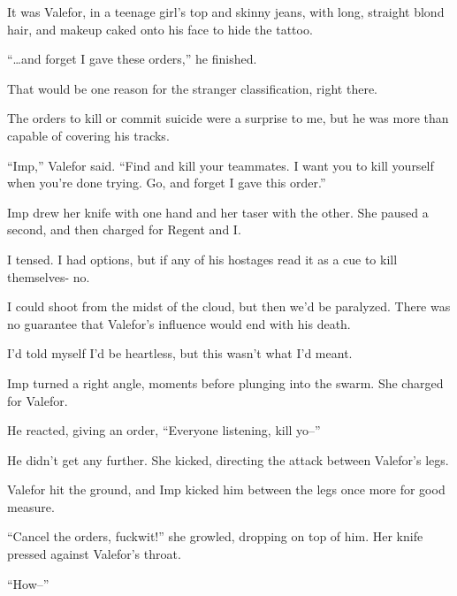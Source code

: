 It was Valefor, in a teenage girl's top and skinny jeans, with long, straight blond hair, and makeup caked onto his face to hide the tattoo.



``\ldots{}and forget I gave these orders,'' he finished.



That would be one reason for the stranger classification, right there.



The orders to kill or commit suicide were a surprise to me, but he was more than capable of covering his tracks.



``Imp,'' Valefor said.  ``Find and kill your teammates.  I want you to kill yourself when you're done trying.  Go, and forget I gave this order.''



Imp drew her knife with one hand and her taser with the other.  She paused a second, and then charged for Regent and I.



I tensed.  I had options, but if any of his hostages read it as a cue to kill themselves-  no.



I could shoot from the midst of the cloud, but then we'd be paralyzed.  There was no guarantee that Valefor's influence would end with his death.



I'd told myself I'd be heartless, but this wasn't what I'd meant.



Imp turned a right angle, moments before plunging into the swarm.  She charged for Valefor.



He reacted, giving an order, ``Everyone listening, kill yo--''



He didn't get any further.  She kicked, directing the attack between Valefor's legs.



Valefor hit the ground, and Imp kicked him between the legs once more for good measure.



``Cancel the orders, fuckwit!'' she growled, dropping on top of him.  Her knife pressed against Valefor's throat.



``How--''



